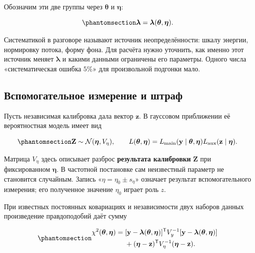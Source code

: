 \documentclass[
  russian,
  11pt,
  a4paper,
  open=any]{scrbook}
\begin{document}
Обозначим эти две группы через \(\boldsymbol\theta\) и
\(\boldsymbol\eta\):

\begin{equation}\protect\phantomsection\label{eq-ch12-nuisance-model}{
\boldsymbol\lambda=\boldsymbol\lambda(\boldsymbol\theta,\boldsymbol\eta).
}\end{equation}

Систематикой в разговоре называют источник неопределённости: шкалу
энергии, нормировку потока, форму фона. Для расчёта нужно уточнить, как
именно этот источник меняет \(\boldsymbol\lambda\) и какими данными
ограничены его параметры. Одного числа «систематическая ошибка \(5\%\)»
для произвольной подгонки мало.

\subsection{Вспомогательное измерение и
штраф}\label{ux432ux441ux43fux43eux43cux43eux433ux430ux442ux435ux43bux44cux43dux43eux435-ux438ux437ux43cux435ux440ux435ux43dux438ux435-ux438-ux448ux442ux440ux430ux444}

Пусть независимая калибровка дала вектор \(\mathbf z\). В гауссовом
приближении её вероятностная модель имеет вид

\begin{equation}\protect\phantomsection\label{eq-ch12-auxiliary-likelihood}{
\mathbf Z\sim\mathcal N(\boldsymbol\eta,V_\eta),
\qquad
L(\boldsymbol\theta,\boldsymbol\eta)
=L_{\mathrm{main}}(\mathbf y\mid\boldsymbol\theta,\boldsymbol\eta)
L_{\mathrm{aux}}(\mathbf z\mid\boldsymbol\eta).
}\end{equation}

Матрица \(V_\eta\) здесь описывает разброс \textbf{результата
калибровки} \(\mathbf Z\) при фиксированном \(\boldsymbol\eta\). В
частотной постановке сам неизвестный параметр не становится случайным.
Запись «\(\eta=\eta_0\pm s_\eta\)» означает результат вспомогательного
измерения; его полученное значение \(\eta_0\) играет роль \(z\).

При известных постоянных ковариациях и независимости двух наборов данных
произведение правдоподобий даёт сумму

\begin{equation}\protect\phantomsection\label{eq-ch12-constrained-chi-square}{
\begin{aligned}
\chi^2(\boldsymbol\theta,\boldsymbol\eta)
={}&[\mathbf y-\boldsymbol\lambda(\boldsymbol\theta,\boldsymbol\eta)]^{\mathsf T}
V_y^{-1}[\mathbf y-\boldsymbol\lambda(\boldsymbol\theta,\boldsymbol\eta)]\\
&+(\boldsymbol\eta-\mathbf z)^{\mathsf T}
V_\eta^{-1}(\boldsymbol\eta-\mathbf z).
\end{aligned}
}\end{equation}
\end{document}
